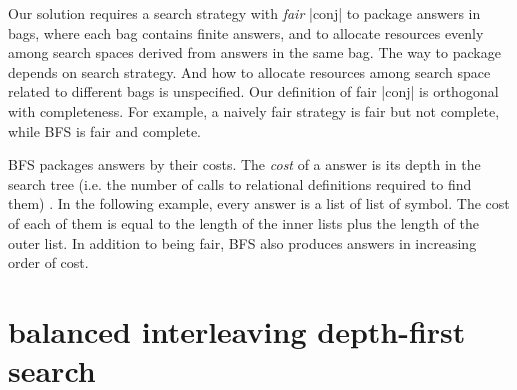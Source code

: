 \documentclass[format=acmlarge, review=true, authordraft=true]{acmart}
\begin{document}


\begin{center}
	\begin{schemeregion}
	\end{schemeregion}
\end{center}

Our solution requires a search strategy with \emph{fair} \scheme|conj| to 
package answers in bags, where each bag contains finite answers, and to allocate 
resources evenly among search spaces derived from answers in the same bag. The 
way to package depends on search strategy. And how to allocate resources among 
search space related to different bags is unspecified. Our definition of fair 
\scheme|conj| is orthogonal with completeness. For example, a naively fair strategy 
is fair but not complete, while BFS is fair and complete. 

BFS packages answers by their costs. The \emph{cost} of a answer is its 
depth in the search tree (i.e. the number of calls to relational definitions 
required to find them) \citet{seres1999algebra}. In the following example, 
every answer is a list of list of symbol. The cost of each of them is equal to 
the length of the inner lists plus the length of the outer list. In addition to 
being fair, BFS also produces answers in increasing order of cost.

\begin{center}
	\begin{schemeregion}
		\schemeinput{Figures/repeato-conj-infinite-sof.rkt}
	\end{schemeregion}
\end{center}

\section{balanced interleaving depth-first search}
\end{document}
